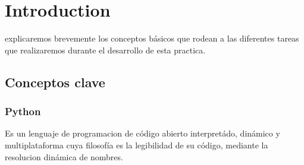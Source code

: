 \documentclass[10pt,journal,compsoc]{IEEEtran}
\begin{document}
\ifCLASSOPTIONcompsoc
{}
\else
\section{Introduction}
\label{sec:introduction}
\fi




% 
% 
% 
% 
 explicaremos brevemente los conceptos básicos que rodean a las diferentes
tareas que realizaremos durante el desarrollo de esta practica.

\subsection{Conceptos clave}
\subsubsection{Python}
Es un lenguaje de programacion de código abierto interpretádo, dinámico y multiplataforma cuya filosofía es la legibilidad de su código, mediante la resolucion dinámica de nombres.
\end{document}
